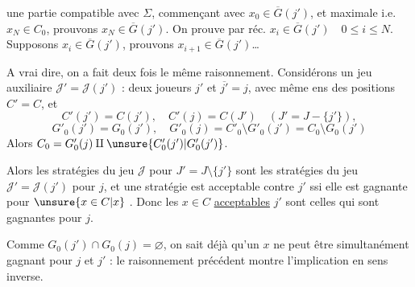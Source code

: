 une partie compatible avec $\Sigma$, commençant avec $x_0\in\overline G(j')$, et maximale i.e. $x_N\in C_0$, prouvons $x_N\in\overline G(j')$. On  prouve par réc. $x_i\in\overline G(j')\quad0\leq i\leq N$.
Supposons $x_i\in\overline G(j')$,  prouvons $x_{i+1}\in\overline G(j')$\ldots

A vrai dire, on a fait deux fois le même raisonnement. Considérons un jeu auxiliaire $\mathcal J'=\mathcal J(j')$ : deux joueurs $j'$ et $\overline{j'}=j$, avec même ens des  positions $C'=C$,  et
\[
C'(j')=C(j'),\quad C'(j)=C(J')\quad(J'=J-\{j'\}),
\]
\[
G'_0(j')=G_0(j'),\quad G'_0(j)=C'_0\setminus G'_0(j')=C_0\setminus G_0(j')
\]
Alors $C_0=G'_0(j)\amalg\unsure{C'_0(j')|G'_0(j')}$.

Alors les stratégies du jeu $\mathcal J$ pour $J'=J\setminus\{j'\}$ sont les stratégies du jeu $\mathcal J'=\mathcal J(j')$ pour $j$, et une stratégie  est acceptable  contre $j'$ ssi elle est gagnante pour $\unsure{x\in C|x}$ .
Donc les  $x\in C$ \uline{acceptables}  $j'$ sont celles qui sont gagnantes pour $j$.

Comme $G_0(j')\cap G_0(j)=\varnothing$, on sait déjà qu'un $x$ ne peut être simultanément gagnant pour $j$ et $j'$ :  le raisonnement précédent montre  l'implication en sens inverse.
